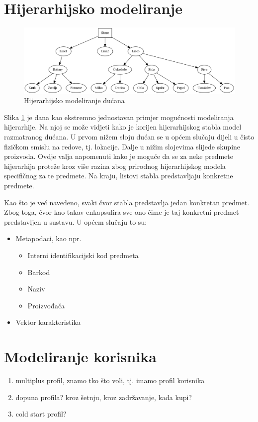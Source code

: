 \documentclass[times, utf8, diplomski, numeric]{fer}
\begin{document}
\section{Hijerarhijsko modeliranje}
\begin{figure}[htb]
	\centering
	\includegraphics[width=14.515cm]{images/storestruct.png}
	\caption{Hijerarhijsko modeliranje dućana}
	\label{fig:storestruct}
\end{figure}
Slika \ref{fig:storestruct} je dana kao ekstremno jednostavan primjer
mogućnosti modeliranja hijerarhije. Na njoj se može vidjeti kako je korijen
hijerarhijskog stabla model razmatranog dućana. U prvom nižem sloju dućan se u
općem slučaju dijeli u čisto fizičkom smislu na redove, tj. lokacije. Dalje u
nižim slojevima slijede skupine proizvoda. Ovdje valja napomenuti kako je moguće
da se za neke predmete hijerarhija proteže kroz više razina zbog prirodnog
hijerarhijskog modela specifičnog za te predmete. Na kraju, listovi stabla
predstavljaju konkretne predmete.

Kao što je već navedeno, svaki čvor stabla predstavlja jedan konkretan
predmet.
Zbog toga, čvor kao takav enkapsulira sve ono čime je taj konkretni predmet
predstavljen u sustavu. U općem slučaju to su:
\begin{itemize}
  \item Metapodaci, kao npr.
	\begin{itemize}
	  \item Interni identifikacijski kod predmeta
	  \item Barkod 
	  \item Naziv
	  \item Proizvođača
	\end{itemize}
  \item Vektor karakteristika
\end{itemize}

\section{Modeliranje korisnika}
\begin{enumerate}
  \item multiplus profil, znamo tko što voli, tj. imamo profil korisnika
  \item dopuna profila? kroz šetnju, kroz zadržavanje, kada kupi?
  \item cold start profil?
\end{enumerate}
\end{document}
